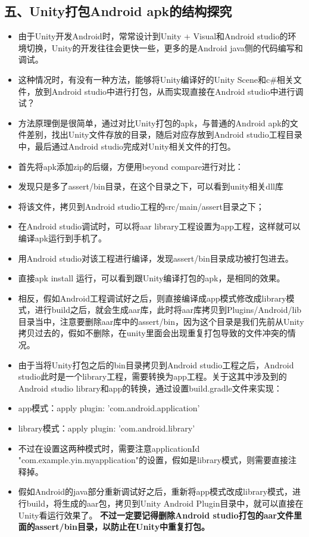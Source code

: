 \documentclass[9pt, b5paper]{article}
\begin{document}
\subsection{五、Unity打包Android apk的结构探究}
\label{sec-1-5}
\begin{itemize}
\item 由于Unity开发Android时，常常设计到Unity + Visual和Android studio的环境切换，Unity的开发往往会更快一些，更多的是Android java侧的代码编写和调试。
\item 这种情况时，有没有一种方法，能够将Unity编译好的Unity Scene和c\#相关文件，放到Android studio中进行打包，从而实现直接在Android studio中进行调试？
\item 方法原理倒是很简单，通过对比Unity打包的apk，与普通的Android apk的文件差别，找出Unity文件存放的目录，随后对应存放到Android studio工程目录中，最后通过Android studio完成对Unity相关文件的打包。
\item 首先将apk添加zip的后缀，方便用beyond compare进行对比：
\item 发现只是多了assert/bin目录，在这个目录之下，可以看到unity相关dll库
\item 将该文件，拷贝到Android studio工程的src/main/assert目录之下；
\item 在Android studio调试时，可以将aar library工程设置为app工程，这样就可以编译apk运行到手机了。
\item 用Android studio对该工程进行编译，发现assert/bin目录成功被打包进去。
\item 直接apk install 运行，可以看到跟Unity编译打包的apk，是相同的效果。
\item 相反，假如Android工程调试好之后，则直接编译成app模式修改成library模式，进行build之后，就会生成aar库，此时将aar库拷贝到Plugins/Android/lib目录当中，注意要删除aar库中的assert/bin，因为这个目录是我们先前从Unity拷贝过去的，假如不删除，在unity里面会出现重复打包导致的文件冲突的情况。
\item 由于当将Unity打包之后的bin目录拷贝到Android studio工程之后，Android studio此时是一个library工程，需要转换为app工程。关于这其中涉及到的Android studio library和app的转换，通过设置build.gradle文件来实现：
\item app模式：apply plugin: 'com.android.application'
\item library模式：apply plugin:   'com.android.library'
\item 不过在设置这两种模式时，需要注意applicationId "com.example.yin.myapplication"的设置，假如是library模式，则需要直接注释掉。
\item 假如Android的java部分重新调试好之后，重新将app模式改成library模式，进行build，将生成的aar包，拷贝到Unity Android Plugin目录中，就可以直接在Unity看运行效果了。 \textbf{不过一定要记得删除Android studio打包的aar文件里面的assert/bin目录，以防止在Unity中重复打包。}
\end{itemize}
\end{document}
